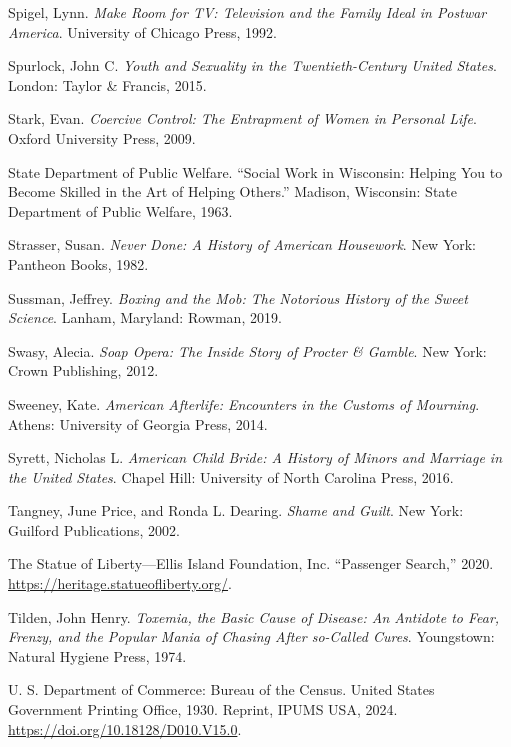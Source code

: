 \documentclass[
  letterpaper,
]{book}
\newlength{\cslhangindent}
\newenvironment{CSLReferences}[2] %
 {\begin{list}{}{%
  \setlength{\itemindent}{0pt}
  \setlength{\leftmargin}{0pt}
  \setlength{\parsep}{0pt}
  \ifodd #1
   \setlength{\leftmargin}{\cslhangindent}
   \setlength{\itemindent}{-1\cslhangindent}
  \fi
  \setlength{\itemsep}{#2\baselineskip}}}
 {\end{list}}
\begin{document}
\begin{CSLReferences}{1}{0}
Spigel, Lynn. \emph{Make Room for TV: Television and the Family Ideal in
Postwar America}. University of Chicago Press, 1992.

Spurlock, John C. \emph{Youth and Sexuality in the Twentieth-Century
United States}. London: Taylor \& Francis, 2015.

Stark, Evan. \emph{Coercive Control: The Entrapment of Women in Personal
Life}. Oxford University Press, 2009.

State Department of Public Welfare. {``Social Work in Wisconsin: Helping
You to Become Skilled in the Art of Helping Others.''} Madison,
Wisconsin: State Department of Public Welfare, 1963.

Strasser, Susan. \emph{Never Done: A History of American Housework}. New
York: Pantheon Books, 1982.

Sussman, Jeffrey. \emph{Boxing and the Mob: The Notorious History of the
Sweet Science}. Lanham, Maryland: Rowman, 2019.

Swasy, Alecia. \emph{Soap Opera: The Inside Story of Procter \& Gamble}.
New York: Crown Publishing, 2012.

Sweeney, Kate. \emph{American Afterlife: Encounters in the Customs of
Mourning}. Athens: University of Georgia Press, 2014.

Syrett, Nicholas L. \emph{American Child Bride: A History of Minors and
Marriage in the United States}. Chapel Hill: University of North
Carolina Press, 2016.

Tangney, June Price, and Ronda L. Dearing. \emph{Shame and Guilt}. New
York: Guilford Publications, 2002.

The Statue of Liberty---Ellis Island Foundation, Inc. {``Passenger
Search,''} 2020. \url{https://heritage.statueofliberty.org/}.

Tilden, John Henry. \emph{Toxemia, the Basic Cause of Disease: An
Antidote to Fear, Frenzy, and the Popular Mania of Chasing After
so-Called Cures}. Youngstown: Natural Hygiene Press, 1974.

U. S. Department of Commerce: Bureau of the Census. United States
Government Printing Office, 1930. Reprint, IPUMS USA, 2024.
\url{https://doi.org/10.18128/D010.V15.0}.


\end{CSLReferences}
\end{document}
